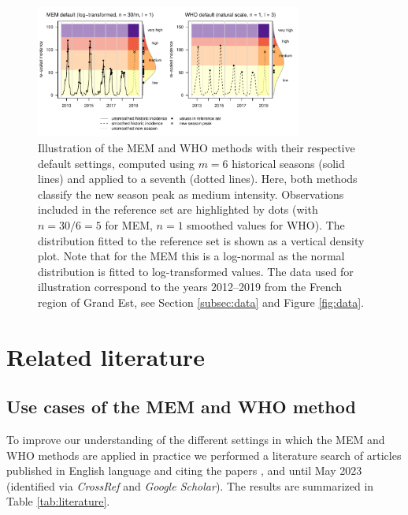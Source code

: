 \documentclass[12pt]{article}
\begin{document}
\begin{figure}
\begin{center}
\includegraphics[width = 0.78\textwidth]{figure/illustration_mem_who.pdf}
\end{center}
\caption{Illustration of the MEM and WHO methods with their respective default settings, computed using $m = 6$ historical seasons (solid lines) and applied to a seventh (dotted lines). Here, both methods classify the new season peak as medium intensity. Observations included in the reference set are highlighted by dots (with $n = 30/6 = 5$ for MEM, $n = 1$ smoothed values for WHO). The distribution fitted to the reference set is shown as a vertical density plot. Note that for the MEM this is a log-normal as the normal distribution is fitted to log-transformed values. The data used for illustration correspond to the years 2012--2019 from the French region of Grand Est, see Section \ref{subsec:data} and Figure \ref{fig:data}.}
\label{fig:illustration}
\end{figure}





\section{Related literature}
\label{sec:review}

\subsection{Use cases of the MEM and WHO method}


To improve our understanding of the different settings in which the MEM and WHO methods are applied in practice we performed a literature search of articles published in English language and citing the papers \cite{Vega2015}, \cite{WHO2014} and \cite{WHO2017} until May 2023 (identified via \textit{CrossRef} and \textit{Google Scholar}). The results are summarized in Table \ref{tab:literature}.
\end{document}
